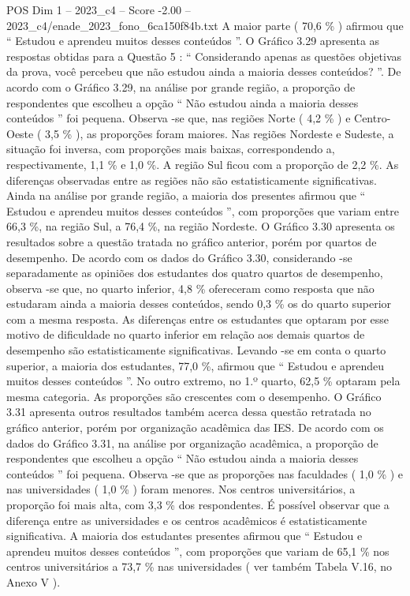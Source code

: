 \begin{textsample}{POS Dim 1 – 2023\_c4 – Score -2.00 – 2023\_c4/enade\_2023\_fono\_6ca150f84b.txt}
A maior parte ( 70,6 \% ) afirmou que “ Estudou e aprendeu muitos desses conteúdos ”.
O Gráfico 3.29 apresenta as respostas obtidas para a Questão 5 : “ Considerando apenas as questões objetivas da prova, você percebeu que não estudou ainda a maioria desses conteúdos? ”.
De acordo com o Gráfico 3.29, na análise por grande região, a proporção de respondentes que escolheu a opção “ Não estudou ainda a maioria desses conteúdos ” foi pequena.
Observa -se que, nas regiões Norte ( 4,2 \% ) e Centro-Oeste ( 3,5 \% ), as proporções foram maiores.
Nas regiões Nordeste e Sudeste, a situação foi inversa, com proporções mais baixas, correspondendo a, respectivamente, 1,1 \% e 1,0 \%.
A região Sul ficou com a proporção de 2,2 \%.
As diferenças observadas entre as regiões não são estatisticamente significativas.
Ainda na análise por grande região, a maioria dos presentes afirmou que “ Estudou e aprendeu muitos desses conteúdos ”, com proporções que variam entre 66,3 \%, na região Sul, a 76,4 \%, na região Nordeste.
O Gráfico 3.30 apresenta os resultados sobre a questão tratada no gráfico anterior, porém por quartos de desempenho.
De acordo com os dados do Gráfico 3.30, considerando -se separadamente as opiniões dos estudantes dos quatro quartos de desempenho, observa -se que, no quarto inferior, 4,8 \% ofereceram como resposta que não estudaram ainda a maioria desses conteúdos, sendo 0,3 \% os do quarto superior com a mesma resposta.
As diferenças entre os estudantes que optaram por esse motivo de dificuldade no quarto inferior em relação aos demais quartos de desempenho são estatisticamente significativas.
Levando -se em conta o quarto superior, a maioria dos estudantes, 77,0 \%, afirmou que “ Estudou e aprendeu muitos desses conteúdos ”.
No outro extremo, no 1.º quarto, 62,5 \% optaram pela mesma categoria.
As proporções são crescentes com o desempenho.
O Gráfico 3.31 apresenta outros resultados também acerca dessa questão retratada no gráfico anterior, porém por organização acadêmica das IES.
De acordo com os dados do Gráfico 3.31, na análise por organização acadêmica, a proporção de respondentes que escolheu a opção “ Não estudou ainda a maioria desses conteúdos ” foi pequena.
Observa -se que as proporções nas faculdades ( 1,0 \% ) e nas universidades ( 1,0 \% ) foram menores.
Nos centros universitários, a proporção foi mais alta, com 3,3 \% dos respondentes.
É possível observar que a diferença entre as universidades e os centros acadêmicos é estatisticamente significativa.
A maioria dos estudantes presentes afirmou que “ Estudou e aprendeu muitos desses conteúdos ”, com proporções que variam de 65,1 \% nos centros universitários a 73,7 \% nas universidades ( ver também Tabela V.16, no Anexo V ).

\end{textsample}
